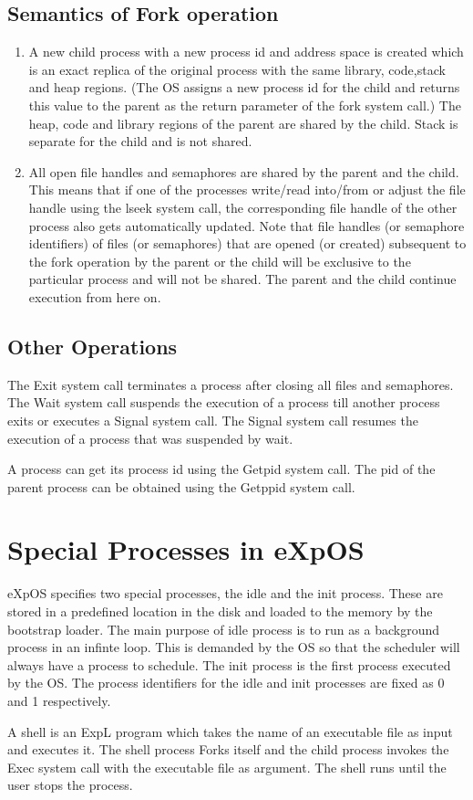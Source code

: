 \subsection{Semantics of Fork operation}
\begin{enumerate}
\item A new child process with a new process id and address space is created which is an exact replica of the original process with the same library, code,stack and heap regions. (The OS assigns a new process id for the child and returns this value to the parent as the return parameter of the fork system call.) The heap, code and library regions of the parent are shared by the child. Stack is separate for the child and is not shared.
\item All open file handles and semaphores are shared by the parent and the child. This means that if one of the processes write/read into/from or adjust the file handle using the lseek system call, the corresponding file handle of the other process also gets automatically updated. Note that file handles (or semaphore identifiers) of files (or semaphores) that are opened (or created) subsequent to the fork operation by the parent or the child will be exclusive to the particular process and will not be shared. The parent and the child continue execution from here on.
\end{enumerate}

\subsection{Other Operations}
The Exit system call terminates a process after closing all files and semaphores. The Wait system call suspends the execution of a process till another process exits or executes a Signal system call. The Signal system call resumes the execution of a process that was suspended by wait.

A process can get its process id using the Getpid system call. The pid of the parent process can be obtained using the Getppid system call.

\section{Special Processes in eXpOS}
eXpOS specifies two special processes, the idle and the init process. These are stored in a predefined location in the disk and loaded to the memory by the bootstrap loader. The main purpose of idle process is to run as a background process in an infinte loop. This is demanded by the OS so that the scheduler will always have a process to schedule. The init process is the first process executed by the OS. The process identifiers for the idle and init processes are fixed as 0 and 1 respectively.

A shell is an ExpL program which takes the name of an executable file as input and executes it. The shell process Forks itself and the child process invokes the Exec system call with the executable file as argument. The shell runs until the user stops the process.
